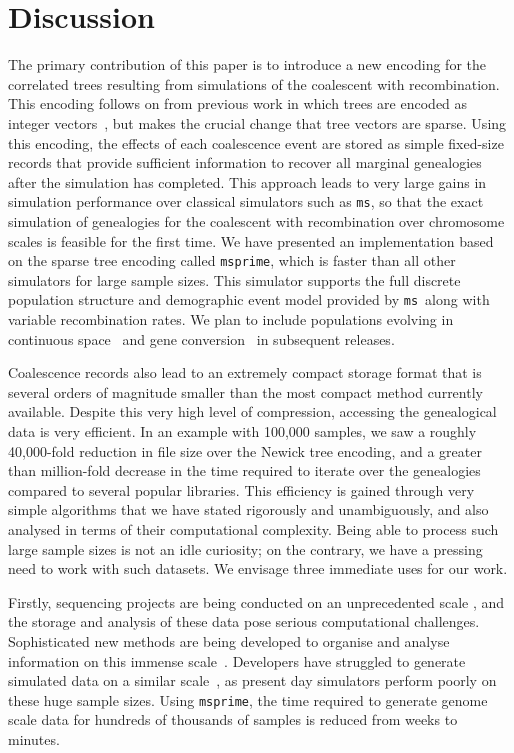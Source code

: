 \documentclass[10pt,letterpaper]{article}
\newcommand{\ms}[0]{\texttt{ms}}
\newcommand{\msprime}[0]{\texttt{msprime}}
\begin{document}
\section*{Discussion}
\label{sec-discussion}

The primary contribution of this paper is to introduce a new encoding for the
correlated trees resulting from simulations of the coalescent with
recombination. This encoding follows on from previous work in which trees are
encoded as integer vectors~\citep{kbe13,keb14}, but makes the crucial change
that tree vectors are sparse. Using this encoding, the effects of each
coalescence event are stored as simple fixed-size records that provide
sufficient information to recover all marginal genealogies after the simulation has
completed. This approach leads to very large gains in simulation performance
over classical simulators such as \ms, so that the exact simulation of
genealogies for the coalescent with recombination over chromosome scales is
feasible for the first time. We have presented an implementation based on the
sparse tree encoding called \msprime, which is faster than all other simulators
for large sample sizes. This simulator supports the full discrete population
structure and demographic event model provided by \ms\ along with
variable recombination rates. We plan to include
populations evolving in continuous space~\citep{bev10,bke10,bev13}
and gene conversion~\citep{wh00} in subsequent releases.

Coalescence records also lead to an extremely compact storage format that is
several orders of magnitude smaller than the most compact method currently
available. Despite this very high level of compression, accessing the
genealogical data is very efficient. In an example with 100,000 samples, we saw
a roughly 40,000-fold reduction in file size over the Newick tree encoding, and
a greater than million-fold decrease in the time required to iterate over the
genealogies compared to several popular libraries. This efficiency is gained
through very simple algorithms that we have stated rigorously and unambiguously,
and also analysed in terms of their computational complexity. Being able to
process such large sample sizes is not an idle curiosity; on the contrary, we have a
pressing need to work with such datasets. We envisage three immediate
uses for our work.

Firstly, sequencing projects are being conducted on an unprecedented
scale \citep{gn14,u15,1k15,ghgz15,e15,slfc15}, and the storage and analysis of
these data pose serious computational challenges. Sophisticated new methods are
being developed to organise and analyse information on this immense
scale~\citep{d14,l15,lkkq15}. Developers have struggled to generate
simulated data on a similar scale~\citep{d14,lkkq15}, as present day simulators
perform poorly on these huge sample sizes. Using \msprime, the time required to
generate genome scale data for hundreds of thousands of samples is reduced from
weeks to minutes.
\end{document}
